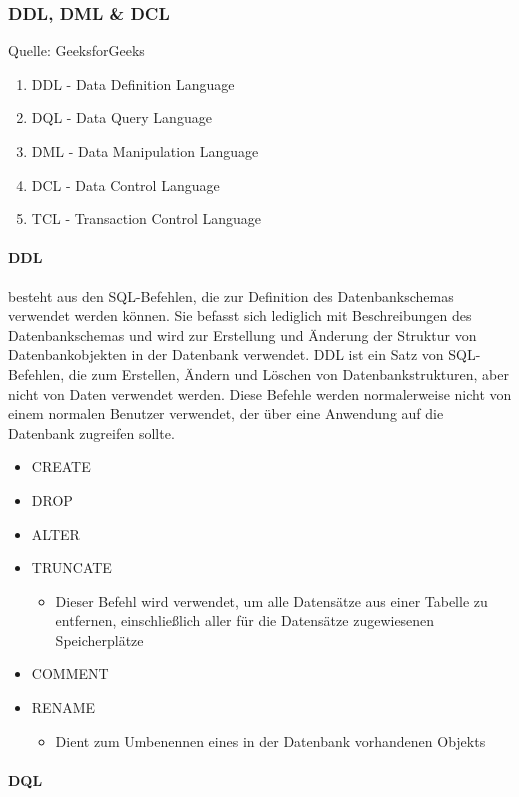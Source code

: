 \subsubsection{DDL, DML \& DCL}
\label{sec:DDLDMLDCL}

Quelle: GeeksforGeeks \cite{DDLDMLDCL}

\begin{enumerate}
	\item DDL - Data Definition Language
	\item DQL - Data Query Language
	\item DML - Data Manipulation Language
	\item DCL - Data Control Language
	\item TCL - Transaction Control Language
\end{enumerate}

\paragraph{DDL} besteht aus den SQL-Befehlen, die zur Definition des Datenbankschemas verwendet werden können. Sie befasst sich lediglich mit Beschreibungen des Datenbankschemas und wird zur Erstellung und Änderung der Struktur von Datenbankobjekten in der Datenbank verwendet. DDL ist ein Satz von SQL-Befehlen, die zum Erstellen, Ändern und Löschen von Datenbankstrukturen, aber nicht von Daten verwendet werden. Diese Befehle werden normalerweise nicht von einem normalen Benutzer verwendet, der über eine Anwendung auf die Datenbank zugreifen sollte.

\begin{itemize}
	\item CREATE
	\item DROP
	\item ALTER
	\item TRUNCATE
	\begin{itemize}
		\item Dieser Befehl wird verwendet, um alle Datensätze aus einer Tabelle zu entfernen, einschließlich aller für die Datensätze zugewiesenen Speicherplätze
	\end{itemize}
	\item COMMENT
	\item RENAME
	\begin{itemize}
		\item Dient zum Umbenennen eines in der Datenbank vorhandenen Objekts
	\end{itemize}
\end{itemize}

\paragraph{DQL} 
